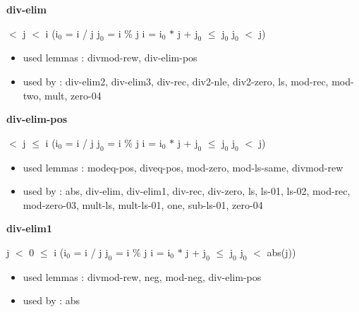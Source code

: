 \documentclass[a4paper]{article}
\begin{document}
\medskip

\bigskip

{\large\bf div-elim}

\medskip

  $<$ j  $<$ i \Imp ($\mbox{i}_{0}$ = i / j \And $\mbox{j}_{0}$ = i \% j \Equiv i = $\mbox{i}_{0}$ $*$ j + $\mbox{j}_{0}$  $\le$ $\mbox{j}_{0}$ \And $\mbox{j}_{0}$ $<$ j)

\begin{itemize}


\item       used lemmas  : divmod-rew, div-elim-pos
\item       used by      : div-elim2, div-elim3, div-rec, div2-nle, div2-zero, ls, mod-rec, mod-two, mult, zero-04

\end{itemize}

\medskip

\bigskip

{\large\bf div-elim-pos}

\medskip

  $<$ j  $\le$ i \Imp ($\mbox{i}_{0}$ = i / j \And $\mbox{j}_{0}$ = i \% j \Equiv i = $\mbox{i}_{0}$ $*$ j + $\mbox{j}_{0}$  $\le$ $\mbox{j}_{0}$ \And $\mbox{j}_{0}$ $<$ j)

\begin{itemize}


\item       used lemmas  : modeq-pos, diveq-pos, mod-zero, mod-ls-same, divmod-rew
\item       used by      : abs, div-elim, div-elim1, div-rec, div-zero, ls, ls-01, ls-02, mod-rec, mod-zero-03, mult-ls, mult-ls-01, one, sub-ls-01, zero-04

\end{itemize}

\medskip

\bigskip

{\large\bf div-elim1}

\medskip

 \Fol j $<$ 0  $\le$ i \Imp ($\mbox{i}_{0}$ = i / j \And $\mbox{j}_{0}$ = i \% j \Equiv i = $\mbox{i}_{0}$ $*$ j + $\mbox{j}_{0}$  $\le$ $\mbox{j}_{0}$ \And $\mbox{j}_{0}$ $<$ abs(j))

\begin{itemize}


\item       used lemmas  : divmod-rew, neg, mod-neg, div-elim-pos
\item       used by      : abs

\end{itemize}
\end{document}
